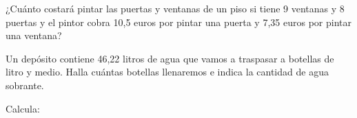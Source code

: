 \documentclass[spanish, 11pt]{exam}
\begin{document}
\begin{questions}
\question[2] ¿Cuánto costará pintar las puertas y ventanas de un piso si tiene 9 ventanas y 8 puertas y el pintor cobra 10,5 euros por pintar una puerta y 7,35 euros por pintar una ventana?



\question[2] Un depósito contiene 46,22 litros de agua que vamos a traspasar a botellas de litro y medio. Halla cuántas botellas
llenaremos e indica la cantidad de agua sobrante.
% 


    

\question[2] Calcula:
\begin{multicols}{2}
\end{multicols}
\end{questions}
\end{document}
